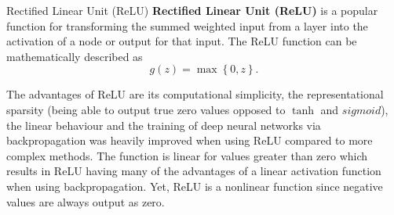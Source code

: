   \begin{pabox}{Rectified Linear Unit (ReLU)}
  \label{def:relu-definition}
    \textbf{Rectified Linear Unit (ReLU)} is a popular function for transforming the summed weighted input from a layer into the activation of a node or output for that input.
    The ReLU function can be mathematically described as $$g(z) = \max \left\{0, z\right\}.$$

  \end{pabox}
  The advantages of ReLU are its computational simplicity, the representational sparsity (being able to output true zero values opposed to $\tanh$ and $sigmoid$), the linear behaviour and the training of deep neural networks via backpropagation was heavily improved when using ReLU compared to more complex methods. The function is linear for values greater than zero which results in ReLU having many of the advantages of a linear activation function when using backpropagation. Yet, ReLU is a nonlinear function since negative values are always output as zero.

